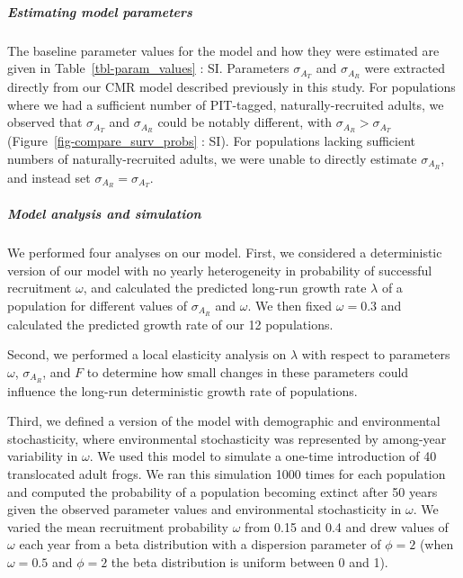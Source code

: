 \documentclass[9pt,twoside,lineno]{pnas-new}
\begin{document}
\hypertarget{estimating-model-parameters}{%
\subparagraph{Estimating model
parameters}\label{estimating-model-parameters}}

The baseline parameter values for the model and how they were estimated
are given in Table~\ref{tbl-param_values} : SI. Parameters
\(\sigma_{A_T}\) and \(\sigma_{A_R}\) were extracted directly from our
CMR model described previously in this study. For populations where we
had a sufficient number of PIT-tagged, naturally-recruited adults, we
observed that \(\sigma_{A_T}\) and \(\sigma_{A_R}\) could be notably
different, with \(\sigma_{A_R} > \sigma_{A_T}\)
(Figure~\ref{fig-compare_surv_probs} : SI). For populations lacking
sufficient numbers of naturally-recruited adults, we were unable to
directly estimate \(\sigma_{A_R}\), and instead set
\(\sigma_{A_R} = \sigma_{A_T}\).

\hypertarget{model-analysis-and-simulation}{%
\subparagraph{Model analysis and
simulation}\label{model-analysis-and-simulation}}

We performed four analyses on our model. First, we considered a
deterministic version of our model with no yearly heterogeneity in
probability of successful recruitment \(\omega\), and calculated the
predicted long-run growth rate \(\lambda\) of a population for different
values of \(\sigma_{A_R}\) and \(\omega\). We then fixed
\(\omega = 0.3\) and calculated the predicted growth rate of our 12
populations.

Second, we performed a local elasticity analysis on \(\lambda\) with
respect to parameters \(\omega\), \(\sigma_{A_R}\), and \(F\) to
determine how small changes in these parameters could influence the
long-run deterministic growth rate of populations.

Third, we defined a version of the model with demographic and
environmental stochasticity, where environmental stochasticity was
represented by among-year variability in \(\omega\). We used this model
to simulate a one-time introduction of 40 translocated adult frogs. We
ran this simulation 1000 times for each population and computed the
probability of a population becoming extinct after 50 years given the
observed parameter values and environmental stochasticity in \(\omega\).
We varied the mean recruitment probability \(\omega\) from 0.15 and 0.4
and drew values of \(\omega\) each year from a beta distribution with a
dispersion parameter of \(\phi = 2\) (when \(\omega = 0.5\) and
\(\phi = 2\) the beta distribution is uniform between 0 and 1).
\end{document}

